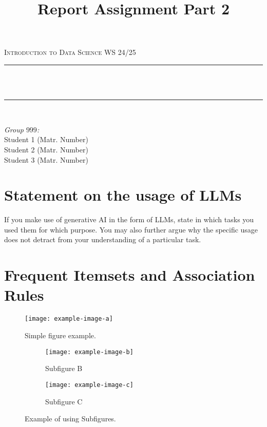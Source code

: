 \documentclass[12pt]{report}
\title{Report Assignment Part 2}
\author{}
\date{}
\makeatletter
\let\thetitle\@title
\makeatother
\begin{document}

    \begin{titlepage}
        \centering
        \vspace*{0.5 cm}
        \begin{center}
            \textsc{\Large Introduction to Data Science WS 24/25}\\[2.0 cm]
        \end{center}
        \rule{\linewidth}{0.2 mm} \\[0.4 cm]
        { \huge \bfseries \thetitle}\\
        \rule{\linewidth}{0.2 mm} \\[1.5 cm]

        \begin{flushright}
            \large
            \emph{Group $999$:} \\
            Student 1 (Matr. Number) \\
            Student 2 (Matr. Number) \\
            Student 3 (Matr. Number)
        \end{flushright}

    \end{titlepage}


     \section*{Statement on the usage of LLMs}
     \textlangle If you make use of generative AI in the form of LLMs, state in which tasks you used them for which purpose.
     You may also further argue why the specific usage does not detract from your understanding of a particular task. \textrangle

     \newpage

    \section{Frequent Itemsets and Association Rules}
    \begin{figure}[h!]
        \centering
        \texttt{[image: example-image-a]}
        \caption{Simple figure example.}
        \label{fig:example-a}
    \end{figure}

    \begin{figure}[h!]
        \centering
        \begin{subfigure}[b]{0.48\textwidth}
            \centering
            \texttt{[image: example-image-b]}
            \caption{Subfigure B}
            \label{fig:example-b}
        \end{subfigure}
        \hfill
        \begin{subfigure}[b]{0.48\textwidth}
            \centering
            \texttt{[image: example-image-c]}
            \caption{Subfigure C}
            \label{fig:example-c}
        \end{subfigure}
        \caption{Example of using Subfigures.}
    \end{figure}
\end{document}
